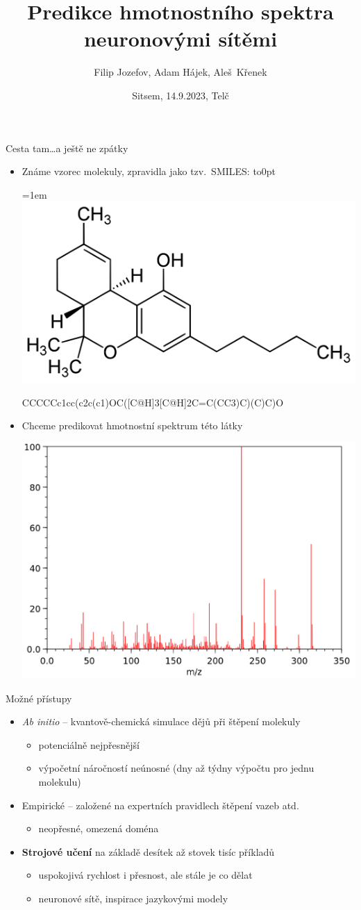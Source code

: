\documentclass[aspectratio=169]{beamer}
\title{Predikce hmotnostního spektra neuronovými sítěmi}
\author{Filip Jozefov, Adam Hájek, Aleš~Křenek}
\date{Sitsem, 14.9.2023, Telč}
\begin{document}
\makeatletter
\maketitle

\begin{frame}
{Cesta tam}{\dots a ještě ne zpátky}

\begin{itemize}
\item Známe vzorec molekuly, zpravidla jako tzv.\ SMILES: \qquad
\vbox to0pt{
\hsize=1em
\includegraphics[height=12ex]{thc-formula}
\par
\vss
}

\medskip
CCCCCc1cc(c2c(c1)OC([C@H]3[C@H]2C=C(CC3)C)(C)C)O 


\medskip
\pause
\item Chceme predikovat hmotnostní spektrum této látky 

\medskip
\includegraphics[width=.4\hsize]{thc-spec}
\end{itemize}
\end{frame}

\begin{frame}
{Možné přístupy}
\begin{itemize}
\item \emph{Ab initio} -- kvantově-chemická simulace dějů při štěpení molekuly
\begin{itemize}
\item potenciálně nejpřesnější
\item výpočetní náročností neúnosné (dny až týdny výpočtu pro jednu molekulu)
\end{itemize}
\medskip
\item Empirické -- založené na expertních pravidlech štěpení vazeb atd.
\begin{itemize}
\item neopřesné, omezená doména
\end{itemize}
\medskip
\item \textbf{Strojové učení} na základě desítek až stovek tisíc příkladů
\begin{itemize}
\item uspokojivá rychlost i přesnost, ale stále je co dělat
\item neuronové sítě, inspirace jazykovými modely
\end{itemize}
\end{itemize}
\end{frame}
\end{document}
